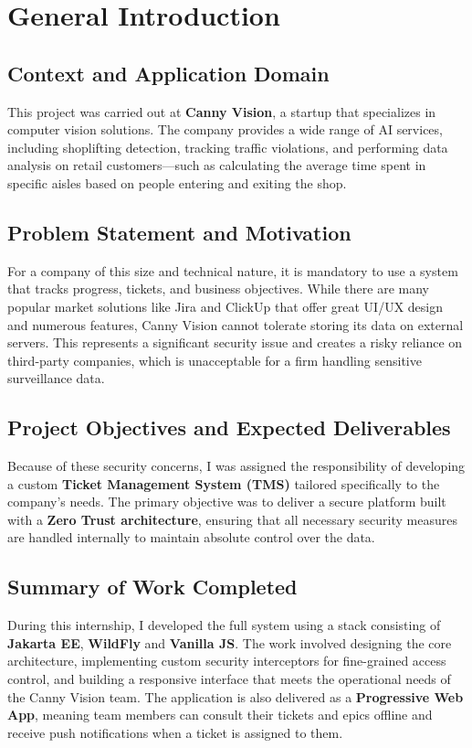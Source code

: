 \chapter*{General Introduction}

\section*{Context and Application Domain}
This project was carried out at \textbf{Canny Vision}, a startup that specializes in computer vision solutions. The company provides a wide range of AI services, including shoplifting detection, tracking traffic violations, and performing data analysis on retail customers—such as calculating the average time spent in specific aisles based on people entering and exiting the shop.

\section*{Problem Statement and Motivation}
For a company of this size and technical nature, it is mandatory to use a system that tracks progress, tickets, and business objectives. While there are many popular market solutions like Jira and ClickUp that offer great UI/UX design and numerous features, Canny Vision cannot tolerate storing its data on external servers. This represents a significant security issue and creates a risky reliance on third-party companies, which is unacceptable for a firm handling sensitive surveillance data.

\section*{Project Objectives and Expected Deliverables}
Because of these security concerns, I was assigned the responsibility of developing a custom \textbf{Ticket Management System (TMS)} tailored specifically to the company's needs. The primary objective was to deliver a secure platform built with a \textbf{Zero Trust architecture}, ensuring that all necessary security measures are handled internally to maintain absolute control over the data.

\section*{Summary of Work Completed}
During this internship, I developed the full system using a stack consisting of \textbf{Jakarta EE}, \textbf{WildFly} and \textbf{Vanilla JS}. The work involved designing the core architecture, implementing custom security interceptors for fine-grained access control, and building a responsive interface that meets the operational needs of the Canny Vision team. The application is also delivered as a \textbf{Progressive Web App}, meaning team members can consult their tickets and epics offline and receive push notifications when a ticket is assigned to them.

